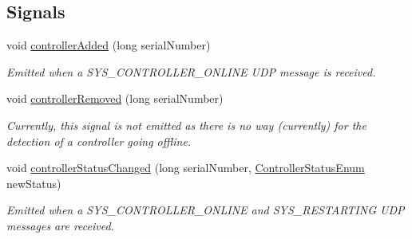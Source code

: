 \subsection*{Signals}
\begin{DoxyCompactItemize}
\item 
\mbox{\label{class_controller_manager_a38c42bcc777c296ff2e0e4c4099dbdf7}} 
void \hyperlink{class_controller_manager_a38c42bcc777c296ff2e0e4c4099dbdf7}{controller\+Added} (long serial\+Number)
\begin{DoxyCompactList}\small\item\em Emitted when a S\+Y\+S\+\_\+\+C\+O\+N\+T\+R\+O\+L\+L\+E\+R\+\_\+\+O\+N\+L\+I\+NE U\+DP message is received. \end{DoxyCompactList}\item 
\mbox{\label{class_controller_manager_aaca6003c9cc1a0c184932fd4b2649b8a}} 
void \hyperlink{class_controller_manager_aaca6003c9cc1a0c184932fd4b2649b8a}{controller\+Removed} (long serial\+Number)
\begin{DoxyCompactList}\small\item\em Currently, this signal is not emitted as there is no way (currently) for the detection of a controller going offline. \end{DoxyCompactList}\item 
\mbox{\label{class_controller_manager_ad065b1ffd21f4f5e2a84b4ce15bf404a}} 
void \hyperlink{class_controller_manager_ad065b1ffd21f4f5e2a84b4ce15bf404a}{controller\+Status\+Changed} (long serial\+Number, \hyperlink{_global_defs_8h_a51207b6a49e0da6f9978a3019d93480a}{Controller\+Status\+Enum} new\+Status)
\begin{DoxyCompactList}\small\item\em Emitted when a S\+Y\+S\+\_\+\+C\+O\+N\+T\+R\+O\+L\+L\+E\+R\+\_\+\+O\+N\+L\+I\+NE and S\+Y\+S\+\_\+\+R\+E\+S\+T\+A\+R\+T\+I\+NG U\+DP messages are received. \end{DoxyCompactList}\end{DoxyCompactItemize}
